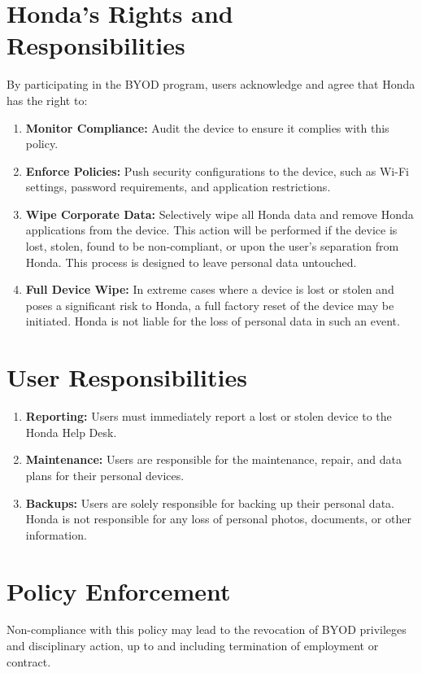\section{Honda's Rights and Responsibilities}
By participating in the BYOD program, users acknowledge and agree that Honda has the right to:
\begin{enumerate}
    \item \textbf{Monitor Compliance:} Audit the device to ensure it complies with this policy.
    \item \textbf{Enforce Policies:} Push security configurations to the device, such as Wi-Fi settings, password requirements, and application restrictions.
    \item \textbf{Wipe Corporate Data:} Selectively wipe all Honda data and remove Honda applications from the device.  This action will be performed if the device is lost, stolen, found to be non-compliant, or upon the user's separation from Honda. This process is designed to leave personal data untouched.
    \item \textbf{Full Device Wipe:} In extreme cases where a device is lost or stolen and poses a significant risk to Honda, a full factory reset of the device may be initiated.  Honda is not liable for the loss of personal data in such an event.
\end{enumerate}
\section{User Responsibilities}
\begin{enumerate}
    \item \textbf{Reporting:} Users must immediately report a lost or stolen device to the Honda Help Desk.
    \item \textbf{Maintenance:} Users are responsible for the maintenance, repair, and data plans for their personal devices.
    \item \textbf{Backups:} Users are solely responsible for backing up their personal data. Honda is not responsible for any loss of personal photos, documents, or other information.
\end{enumerate}
\section{Policy Enforcement} Non-compliance with this policy may lead to the revocation of BYOD privileges and disciplinary action, up to and including termination of employment or contract.